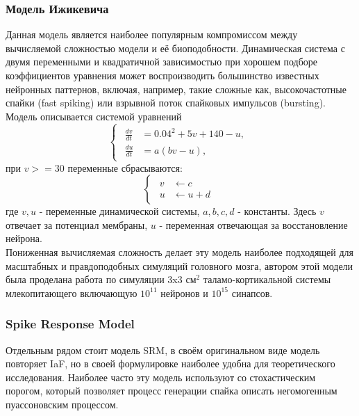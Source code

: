 \documentclass[a4paper,10pt]{article}
\begin{document}
\subsubsection{Модель Ижикевича}
\indent Данная модель является наиболее популярным компромиссом между вычисляемой сложностью модели и её биоподобности. Динамическая система с двумя переменными и квадратичной зависимостью при хорошем подборе коэффициентов уравнения может воспроизводить большинство известных нейронных паттернов\cite{IzhSimpleModel}, включая, например, такие сложные как, высокочастотные спайки (fast spiking) или взрывной поток спайковых импульсов (bursting).\\
\indent Модель описывается системой уравнений
\begin{equation}\label{eq:izh}
\left\{  \begin{array}{c} \begin{aligned}
	\frac{dv}{dt} &= 0.04^2+5v+140-u, \nonumber \\
	\frac{du}{dt} &= a(bv-u), \nonumber 
	\end{aligned}	
	\end{array} \right.
\end{equation}
при $v>=30$ переменные сбрасываются:
\begin{equation}\label{eq:izh_reset}
\left\{  \begin{array}{c} \begin{aligned}
	v &\leftarrow c \nonumber \\
	u &\leftarrow u+d
	\end{aligned}	
	\end{array} \right.
\end{equation}
где $v, u$ - переменные динамической системы, $a, b, c, d$ - константы. Здесь $v$ отвечает за потенциал мембраны, $u$ - переменная отвечающая за восстановление нейрона.\\
\indent Пониженная вычисляемая сложность делает эту модель наиболее подходящей для масштабных и правдоподобных симуляций головного мозга, автором этой модели была проделана работа \cite{IzhTalam} по симуляции 3x3 см$^2$ таламо-кортикальной системы млекопитающего включающую $10^{11}$ нейронов и $10^{15}$ синапсов.
\subsubsection{Spike Response Model}
Отдельным рядом стоит модель SRM, в своём оригинальном виде модель повторяет IaF, но в своей формулировке наиболее удобна для теоретического исследования. Наиболее часто эту модель используют со   стохастическим порогом, который позволяет процесс генерации спайка описать негомогенным пуассоновским процессом.
\end{document}
